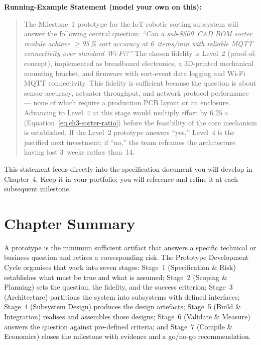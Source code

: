 \bigskip
\noindent\textbf{Running-Example Statement (model your own on this):}

\begin{quote}
The Milestone~1 prototype for the IoT robotic sorting subsystem will answer
the following central question: \emph{``Can a sub-\$500~CAD BOM sorter
module achieve $\geq$95\,\% sort accuracy at 6~items/min with reliable MQTT
connectivity over standard Wi-Fi?''}
The chosen fidelity is Level~2 (proof-of-concept), implemented as breadboard
electronics, a 3D-printed mechanical mounting bracket, and firmware with
sort-event data logging and Wi-Fi MQTT connectivity.
This fidelity is sufficient because the question is about sensor accuracy,
actuator throughput, and network protocol performance --- none of which
require a production PCB layout or an enclosure.
Advancing to Level~4 at this stage would multiply effort by $6.25\times$
(Equation~\ref{eq:ch3-sorter-ratio}) before the feasibility of the core
mechanism is established.
If the Level~2 prototype answers ``yes,'' Level~4 is the justified next
investment; if ``no,'' the team reframes the architecture having lost
3~weeks rather than~14.
\end{quote}

This statement feeds directly into the specification document you will
develop in Chapter~4.
Keep it in your portfolio; you will reference and refine it at each
subsequent milestone.

\section*{Chapter Summary}
\label{sec:ch3-summary}


A prototype is the minimum sufficient artifact that answers a specific
technical or business question and retires a corresponding risk.
The Prototype Development Cycle organises that work into seven stages:
Stage~1 (Specification \& Risk) establishes what must be true and what is
assumed; Stage~2 (Scoping \& Planning) sets the question, the fidelity,
and the success criterion; Stage~3 (Architecture) partitions the system
into subsystems with defined interfaces; Stage~4 (Subsystem Design) produces
the design artefacts; Stage~5 (Build \& Integration) realises and assembles
those designs; Stage~6 (Validate \& Measure) answers the question against
pre-defined criteria; and Stage~7 (Compile \& Economics) closes the milestone
with evidence and a go/no-go recommendation.

